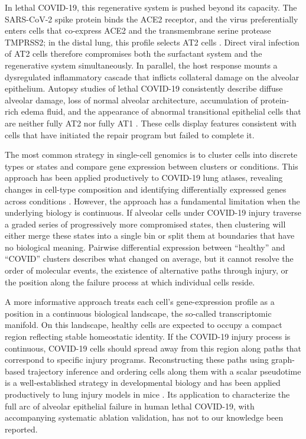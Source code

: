 \documentclass[11pt]{article}
\begin{document}
In lethal COVID-19, this regenerative system is pushed beyond its capacity. The SARS-CoV-2 spike protein binds the ACE2 receptor, and the virus preferentially enters cells that co-express ACE2 and the transmembrane serine protease TMPRSS2; in the distal lung, this profile selects AT2 cells \citep{Ziegler2020, Hou2020}. Direct viral infection of AT2 cells therefore compromises both the surfactant system and the regenerative system simultaneously. In parallel, the host response mounts a dysregulated inflammatory cascade that inflicts collateral damage on the alveolar epithelium. Autopsy studies of lethal COVID-19 consistently describe diffuse alveolar damage, loss of normal alveolar architecture, accumulation of protein-rich edema fluid, and the appearance of abnormal transitional epithelial cells that are neither fully AT2 nor fully AT1 \citep{Borczuk2020, Melms2021}. These cells display features consistent with cells that have initiated the repair program but failed to complete it.

The most common strategy in single-cell genomics is to cluster cells into discrete types or states and compare gene expression between clusters or conditions. This approach has been applied productively to COVID-19 lung atlases, revealing changes in cell-type composition and identifying differentially expressed genes across conditions \citep{Melms2021, Delorey2021, Bharat2020}. However, the approach has a fundamental limitation when the underlying biology is continuous. If alveolar cells under COVID-19 injury traverse a graded series of progressively more compromised states, then clustering will either merge these states into a single bin or split them at boundaries that have no biological meaning. Pairwise differential expression between ``healthy'' and ``COVID'' clusters describes what changed on average, but it cannot resolve the order of molecular events, the existence of alternative paths through injury, or the position along the failure process at which individual cells reside.

A more informative approach treats each cell's gene-expression profile as a position in a continuous biological landscape, the so-called transcriptomic manifold. On this landscape, healthy cells are expected to occupy a compact region reflecting stable homeostatic identity. If the COVID-19 injury process is continuous, COVID-19 cells should spread away from this region along paths that correspond to specific injury programs. Reconstructing these paths using graph-based trajectory inference and ordering cells along them with a scalar pseudotime is a well-established strategy in developmental biology \citep{Haghverdi2016, Setty2019, Street2018} and has been applied productively to lung injury models in mice \citep{Strunz2020, Riemondy2019}. Its application to characterize the full arc of alveolar epithelial failure in human lethal COVID-19, with accompanying systematic ablation validation, has not to our knowledge been reported.
\end{document}
